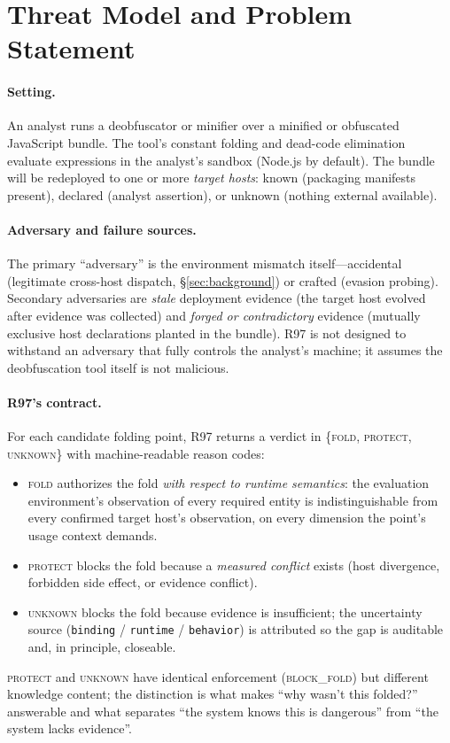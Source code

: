 \documentclass[sigconf,nonacm]{acmart}
\begin{document}
\section{Threat Model and Problem Statement}\label{sec:threat}

\paragraph{Setting.} An analyst runs a deobfuscator or minifier over a minified or obfuscated JavaScript bundle. The tool's constant folding and dead-code elimination evaluate expressions in the analyst's sandbox (Node.js by default). The bundle will be redeployed to one or more \emph{target hosts}: known (packaging manifests present), declared (analyst assertion), or unknown (nothing external available).

\paragraph{Adversary and failure sources.} The primary ``adversary'' is the environment mismatch itself---accidental (legitimate cross-host dispatch, \S\ref{sec:background}) or crafted (evasion probing). Secondary adversaries are \emph{stale} deployment evidence (the target host evolved after evidence was collected) and \emph{forged or contradictory} evidence (mutually exclusive host declarations planted in the bundle). R97 is not designed to withstand an adversary that fully controls the analyst's machine; it assumes the deobfuscation tool itself is not malicious.

\paragraph{R97's contract.} For each candidate folding point, R97 returns a verdict in \{\textsc{fold}, \textsc{protect}, \textsc{unknown}\} with machine-readable reason codes:
\begin{itemize}
  \item \textsc{fold} authorizes the fold \emph{with respect to runtime semantics}: the evaluation environment's observation of every required entity is indistinguishable from every confirmed target host's observation, on every dimension the point's usage context demands.
  \item \textsc{protect} blocks the fold because a \emph{measured conflict} exists (host divergence, forbidden side effect, or evidence conflict).
  \item \textsc{unknown} blocks the fold because evidence is insufficient; the uncertainty source (\texttt{binding} / \texttt{runtime} / \texttt{behavior}) is attributed so the gap is auditable and, in principle, closeable.
\end{itemize}
\textsc{protect} and \textsc{unknown} have identical enforcement (\textsc{block\_fold}) but different knowledge content; the distinction is what makes ``why wasn't this folded?'' answerable and what separates ``the system knows this is dangerous'' from ``the system lacks evidence''.
\end{document}
